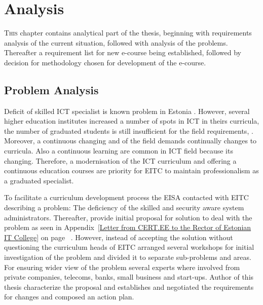 \chapter{Analysis}
\label{analysis}

\lettrine[lraise=0.1, nindent=0em, slope=-.5em]{\color{Violet}T}{his} chapter contains analytical part of the thesis, beginning with requirements analysis of the current situation, followed with analysis of the problems. Thereafter a requirement list for new e-course being established, followed by decision for methodology chosen for development of the e-course. 

\section{Problem Analysis}
\label{Problem Analysis}


Deficit of skilled \gls{ICT} specialist is known problem in Estonia \citep{website:ict_puudu} \citep{website:ict_needs}. However, several higher education institutes increased a number of spots in \gls{ICT} in theirs curricula, the number of graduated students is still insufficient for the field requirements\citep{website:TU_ict}, \citep{website:itc_facts}. Moreover, a continuous changing and of the field demands continually changes to curricula. Also a continuous learning are common in \gls{ICT} field because its changing. Therefore, a modernisation of the  \gls{ICT} curriculum and offering a continuous education courses are priority for \gls{EITC} to maintain professionalism as a graduated specialist.

To facilitate a curriculum development process the \gls{EISA} contacted with \gls{EITC} describing a problem: The deficiency of the skilled and security aware system administrators. Thereafter, provide initial proposal for solution to deal with the problem as seen in Appendix~\ref{Letter from CERT.EE to the Rector of Estonian IT College} on page ~\pageref{Letter from CERT.EE to the Rector of Estonian IT College}. However, instead of accepting the solution without questioning the curriculum heads of \gls{EITC} arranged several workshops for initial investigation of the problem and divided it to separate sub-problems and areas. For ensuring wider view of the problem several experts where involved from private companies, telecoms, banks, small business and start-ups. Author of this thesis characterize the proposal and establishes and negotiated the requirements for changes and composed an action plan.

